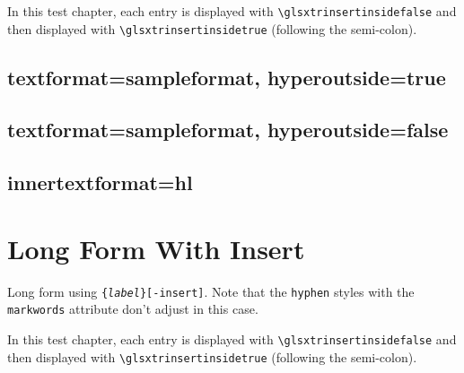 \documentclass{report}
\newcommand{\marg}[1]{\{\textnormal{\emph{#1}}\}}
\begin{document}
In this test chapter, each entry is displayed
with \verb|\glsxtrinsertinsidefalse| and then displayed with
\verb|\glsxtrinsertinsidetrue| 
(following the semi-colon).


\section{textformat=sampleformat, hyperoutside=true}


\section{textformat=sampleformat, hyperoutside=false}


\section{innertextformat=hl}


\chapter{Long Form With Insert}
Long form using \texttt{\string\glsxtrlong\marg{label}[-insert]}.
Note that the \texttt{hyphen} styles with the \texttt{markwords}
attribute don't adjust in this case.

In this test chapter, each entry is displayed
with \verb|\glsxtrinsertinsidefalse| and then displayed with
\verb|\glsxtrinsertinsidetrue| 
(following the semi-colon).
\end{document}
